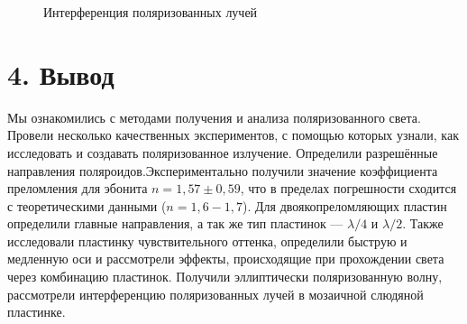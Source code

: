 \documentclass[a4paper,12pt]{report}
\begin{document}
\begin{figure}[H]
\begin{minipage}[h]{0.49\linewidth}
\end{minipage}
\hfill
\begin{minipage}[H]{0.49\linewidth}
\end{minipage}
\caption{Интерференция поляризованных лучей}
\end{figure}


\section*{4. Вывод}

Мы ознакомились с методами получения и анализа поляризованного света. Провели несколько качественных экспериментов, с помощью которых узнали, как исследовать и создавать поляризованное излучение.
Определили разрешённые направления поляроидов.Экспериментально получили значение коэффициента преломления для эбонита $n=1,57\pm 0,59$, что в пределах погрешности сходится с теоретическими данными ($n=1,6-1,7$). Для двоякопреломляющих пластин определили главные направления, а так же тип пластинок --- $\lambda /4$ и $\lambda/2$. Также исследовали пластинку чувствительного оттенка, определили быструю и медленную оси и рассмотрели эффекты, происходящие при прохождении света через комбинацию пластинок. Получили эллиптически поляризованную волну, рассмотрели интерференцию поляризованных лучей в мозаичной слюдяной пластинке.
\end{document}
